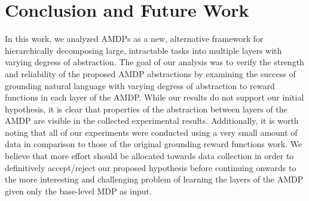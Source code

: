 \documentclass[conference]{IEEEtran}
\begin{document}
\section{Conclusion and Future Work}
\label{sec:conclusion}

In this work, we analyzed AMDPs as a new, alternative framework for hierarchically decomposing large, intractable tasks into multiple layers with varying degress of abstraction. The goal of our analysis was to verify the strength and reliability of the proposed AMDP abstractions by examining the success of grounding natural language with varying degress of abstraction to reward functions in each layer of the AMDP. While our results do not support our initial hypothesis, it is clear that properties of the abstraction between layers of the AMDP are visible in the collected experimental results. Additionally, it is worth noting that all of our experiments were conducted using a very small amount of data in comparison to those of the original grounding reward functions work. We believe that more effort should be allocated towards data collection in order to definitively accept/reject our proposed hypothesis before continuing onwards to the more interesting and challenging problem of learning the layers of the AMDP given only the base-level MDP as input.





\end{document}

